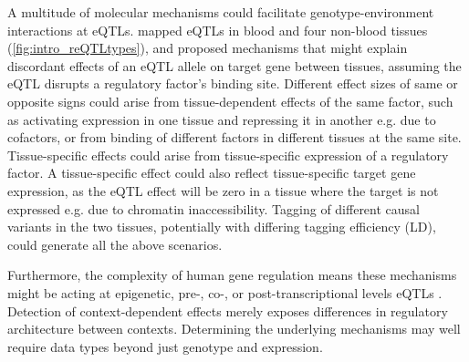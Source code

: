 \begin{outline}
A multitude of molecular mechanisms could facilitate genotype-environment interactions at \glspl{eQTL}.
\textcite{fu2012UnravelingRegulatoryMechanisms} mapped \glspl{eQTL} in blood and four non-blood tissues (\cref{fig:intro_reQTLtypes}), 
and proposed mechanisms that might explain discordant effects of an \gls{eQTL} allele on target gene between tissues,
assuming the \gls{eQTL} disrupts a regulatory factor's binding site.
Different effect sizes of same or opposite signs could arise 
from tissue-dependent effects of the same factor, such as activating expression in one tissue and repressing it in another e.g. due to cofactors,
or from binding of different factors in different tissues at the same site.
Tissue-specific effects could arise from tissue-specific expression of a regulatory factor.
A tissue-specific effect could also reflect tissue-specific target gene expression,
as the \gls{eQTL} effect will be zero in a tissue where the target is not expressed e.g. due to chromatin inaccessibility.
Tagging of different causal variants in the two tissues, potentially with differing tagging efficiency (\gls{LD}), could generate all the above scenarios.

Furthermore, the complexity of human gene regulation means these mechanisms might be acting at epigenetic, pre-, co-, or post-transcriptional levels \glspl{eQTL} \autocite{gaffney2013GlobalPropertiesFunctional}.
Detection of context-dependent effects merely exposes differences in regulatory architecture between contexts.
Determining the underlying mechanisms may well require data types beyond just genotype and expression.


\end{outline}

